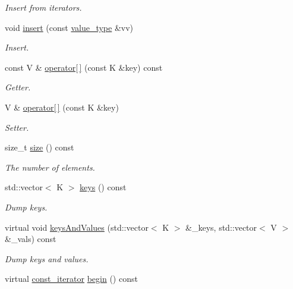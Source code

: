 \begin{DoxyCompactItemize}
\begin{DoxyCompactList}\small\item\em Insert from iterators. \end{DoxyCompactList}\item 
void \mbox{\hyperlink{classADAT_1_1MapObject_aaa819ee6219acf8f74c39563c9c68ab4}{insert}} (const \mbox{\hyperlink{classADAT_1_1MapObject_ad985e6ff5b35a72c79d4b466d316cc0a}{value\+\_\+type}} \&vv)
\begin{DoxyCompactList}\small\item\em Insert. \end{DoxyCompactList}\item 
const V \& \mbox{\hyperlink{classADAT_1_1MapObject_adb014dc7d3ef80a73fd1734e818eeef4}{operator\mbox{[}$\,$\mbox{]}}} (const K \&key) const
\begin{DoxyCompactList}\small\item\em Getter. \end{DoxyCompactList}\item 
V \& \mbox{\hyperlink{classADAT_1_1MapObject_ab6ac0d8eccffc7975fd329649dd6f9e7}{operator\mbox{[}$\,$\mbox{]}}} (const K \&key)
\begin{DoxyCompactList}\small\item\em Setter. \end{DoxyCompactList}\item 
size\+\_\+t \mbox{\hyperlink{classADAT_1_1MapObject_ac0f5c3b258d234a7baf4f3d75e304af7}{size}} () const
\begin{DoxyCompactList}\small\item\em The number of elements. \end{DoxyCompactList}\item 
std\+::vector$<$ K $>$ \mbox{\hyperlink{classADAT_1_1MapObject_af767d0e9da82e3a249d3340d57da66e1}{keys}} () const
\begin{DoxyCompactList}\small\item\em Dump keys. \end{DoxyCompactList}\item 
virtual void \mbox{\hyperlink{classADAT_1_1MapObject_ab19c1622f3edfd0755e42583e6a48844}{keys\+And\+Values}} (std\+::vector$<$ K $>$ \&\+\_\+keys, std\+::vector$<$ V $>$ \&\+\_\+vals) const
\begin{DoxyCompactList}\small\item\em Dump keys and values. \end{DoxyCompactList}\item 
virtual \mbox{\hyperlink{classADAT_1_1MapObject_a4622cd7d3b6fed18fe226d28091cc6c8}{const\+\_\+iterator}} \mbox{\hyperlink{classADAT_1_1MapObject_a7f4f6830f0efcc2fcd7bb2aebe0b0c95}{begin}} () const

\end{DoxyCompactItemize}
